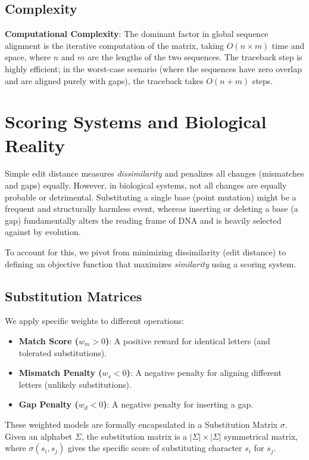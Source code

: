 \subsection{Complexity}
\begin{important}
  \textbf{Computational Complexity}: 
  The dominant factor in global sequence alignment is the iterative computation of the matrix, taking $O(n \times m)$ time and space, where $n$ and $m$ are the lengths of the two sequences. The traceback step is highly efficient; in the worst-case scenario (where the sequences have zero overlap and are aligned purely with gaps), the traceback takes $O(n + m)$ steps.
\end{important}

\section{Scoring Systems and Biological Reality}
Simple edit distance measures \textit{dissimilarity} and penalizes all changes (mismatches and gaps) equally. However, in biological systems, not all changes are equally probable or detrimental. Substituting a single base (point mutation) might be a frequent and structurally harmless event, whereas inserting or deleting a base (a gap) fundamentally alters the reading frame of DNA and is heavily selected against by evolution.

To account for this, we pivot from minimizing dissimilarity (edit distance) to defining an objective function that maximizes \textit{similarity} using a scoring system.

\subsection{Substitution Matrices}
We apply specific weights to different operations:
\begin{itemize}
    \item \textbf{Match Score ($w_m > 0$)}: A positive reward for identical letters (and tolerated substitutions).
    \item \textbf{Mismatch Penalty ($w_s < 0$)}: A negative penalty for aligning different letters (unlikely substitutions).
    \item \textbf{Gap Penalty ($w_d < 0$)}: A negative penalty for inserting a gap.
\end{itemize}

These weighted models are formally encapsulated in a Substitution Matrix $\sigma$. Given an alphabet $\Sigma$, the substitution matrix is a $|\Sigma| \times |\Sigma|$ symmetrical matrix, where $\sigma(s_i, s_j)$ gives the specific score of substituting character $s_i$ for $s_j$. 

